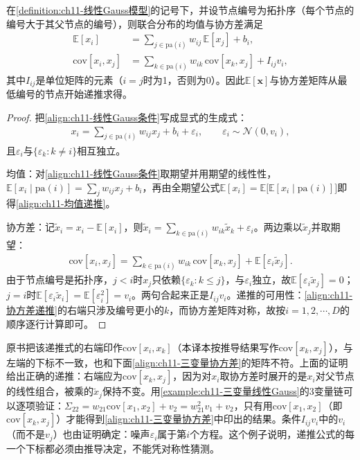 \documentclass[../../main.tex]{subfiles}
\begin{document}
\begin{proposition}[线性Gauss模型的矩递推]\label{proposition:ch11-线性Gauss矩}
在\cref{definition:ch11-线性Gauss模型}的记号下，并设节点编号为拓扑序（每个节点的编号大于其父节点的编号），则联合分布的均值与协方差满足
\begin{align}
  \mathbb{E}[x_i] &= \sum_{j\in\mathrm{pa}(i)}w_{ij}\,\mathbb{E}[x_j]+b_i,
  \label{align:ch11-均值递推}\\
  \mathrm{cov}[x_i,x_j] &= \sum_{k\in\mathrm{pa}(i)}w_{ik}\,\mathrm{cov}[x_k,x_j]+I_{ij}v_i,
  \label{align:ch11-协方差递推}
\end{align}
其中$I_{ij}$是单位矩阵的元素（$i=j$时为1，否则为0）。因此$\mathbb{E}[\mathbf{x}]$与协方差矩阵从最低编号的节点开始递推求得。
\end{proposition}

\begin{proof}
把\eqref{align:ch11-线性Gauss条件}写成显式的生成式：
\begin{align}
  x_i = \sum_{j\in\mathrm{pa}(i)}w_{ij}x_j+b_i+\varepsilon_i,\qquad \varepsilon_i\sim\mathcal{N}(0,v_i),
\end{align}
且$\varepsilon_i$与$\{\varepsilon_k:k\neq i\}$相互独立。

均值：对\eqref{align:ch11-线性Gauss条件}取期望并用期望的线性性，$\mathbb{E}[x_i\mid \mathrm{pa}(i)]=\sum_j w_{ij}x_j+b_i$，再由全期望公式$\mathbb{E}[x_i]=\mathbb{E}\bigl[\mathbb{E}[x_i\mid\mathrm{pa}(i)]\bigr]$即得\eqref{align:ch11-均值递推}。

协方差：记$\tilde{x}_i=x_i-\mathbb{E}[x_i]$，则$\tilde{x}_i=\sum_{k\in\mathrm{pa}(i)}w_{ik}\tilde{x}_k+\varepsilon_i$。两边乘以$\tilde{x}_j$并取期望：
\begin{align}
  \mathrm{cov}[x_i,x_j] = \sum_{k\in\mathrm{pa}(i)}w_{ik}\,\mathrm{cov}[x_k,x_j]+\mathbb{E}[\varepsilon_i\tilde{x}_j].
\end{align}
由于节点编号是拓扑序，$j<i$时$x_j$只依赖$\{\varepsilon_k:k\leqslant j\}$，与$\varepsilon_i$独立，故$\mathbb{E}[\varepsilon_i\tilde{x}_j]=0$；$j=i$时$\mathbb{E}[\varepsilon_i\tilde{x}_i]=\mathbb{E}[\varepsilon_i^{2}]=v_i$。两句合起来正是$I_{ij}v_i$。递推的可用性：\eqref{align:ch11-协方差递推}的右端只涉及编号更小的$k$，而协方差矩阵对称，故按$i=1,2,\cdots,D$的顺序逐行计算即可。
\end{proof}

\begin{remark}
原书把该递推式的右端印作$\mathrm{cov}[x_i,x_k]$（本译本按推导结果写作$\mathrm{cov}[x_k,x_j]$），与左端的下标不一致，也和下面\eqref{align:ch11-三变量协方差}的矩阵不符。上面的证明给出正确的递推：右端应为$\mathrm{cov}[x_k,x_j]$，因为对$x_i$取协方差时展开的是$x_i$对父节点的线性组合，被乘的$\tilde{x}_j$保持不变。用\cref{example:ch11-三变量线性Gauss}的$3$变量链可以逐项验证：$\Sigma_{22}=w_{21}\mathrm{cov}[x_1,x_2]+v_2=w_{21}^{2}v_1+v_2$，只有用$\mathrm{cov}[x_1,x_2]$（即$\mathrm{cov}[x_k,x_j]$）才能得到\eqref{align:ch11-三变量协方差}中印出的结果。条件$I_{ij}v_i$中的$v_i$（而不是$v_j$）也由证明确定：噪声$\varepsilon_i$属于第$i$个方程。这个例子说明，递推公式的每一个下标都必须由推导决定，不能凭对称性猜测。
\end{remark}
\end{document}
